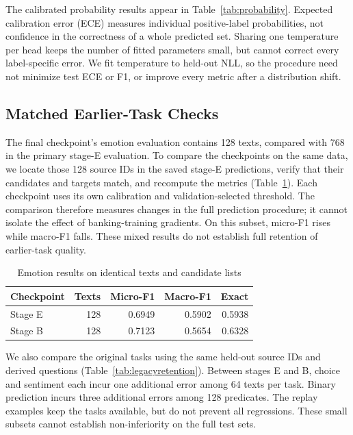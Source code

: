 \documentclass[conference]{IEEEtran}
\begin{document}
The calibrated probability results appear in Table~\ref{tab:probability}. Expected calibration error (ECE) measures individual positive-label probabilities, not confidence in the correctness of a whole predicted set. Sharing one temperature per head keeps the number of fitted parameters small, but cannot correct every label-specific error. We fit temperature to held-out NLL, so the procedure need not minimize test ECE or F1, or improve every metric after a distribution shift.

\subsection{Matched Earlier-Task Checks}
The final checkpoint's emotion evaluation contains 128 texts, compared with 768 in the primary stage-E evaluation. To compare the checkpoints on the same data, we locate those 128 source IDs in the saved stage-E predictions, verify that their candidates and targets match, and recompute the metrics (Table~\ref{tab:emotionretention}). Each checkpoint uses its own calibration and validation-selected threshold. The comparison therefore measures changes in the full prediction procedure; it cannot isolate the effect of banking-training gradients. On this subset, micro-F1 rises while macro-F1 falls. These mixed results do not establish full retention of earlier-task quality.

\begin{table}[!t]
\caption{Emotion results on identical texts and candidate lists}
\label{tab:emotionretention}
\centering\footnotesize\setlength{\tabcolsep}{4pt}
\begin{tabular}{lrrrr}\toprule
Checkpoint & Texts & Micro-F1 & Macro-F1 & Exact\\\midrule
Stage E & 128 & 0.6949 & 0.5902 & 0.5938\\
Stage B & 128 & 0.7123 & 0.5654 & 0.6328\\
\bottomrule\end{tabular}
\end{table}

We also compare the original tasks using the same held-out source IDs and derived questions (Table~\ref{tab:legacyretention}). Between stages E and B, choice and sentiment each incur one additional error among 64 texts per task. Binary prediction incurs three additional errors among 128 predicates. The replay examples keep the tasks available, but do not prevent all regressions. These small subsets cannot establish non-inferiority on the full test sets.
\end{document}
